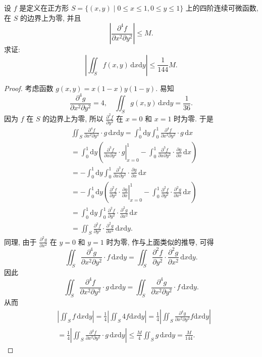 \documentclass[../../main.tex]{subfiles}%
\begin{document}
\begin{example}
设 \( f \) 是定义在正方形 \( S = \{ (x,y) \mid 0 \leqslant x \leqslant 1, 0 \leqslant y \leqslant 1 \} \) 上的四阶连续可微函数, 在 \( S \) 的边界上为零, 并且
\[
\left| \frac{\partial^4 f}{\partial x^2 \partial y^2} \right| \leqslant M.
\]
求证: 
\[
\left| \iint_S f(x,y) \, \mathrm{d}x\mathrm{d}y \right| \leqslant \frac{1}{144} M.
\]
\end{example}
\begin{proof}

考虑函数 \( g(x,y) = x(1 - x)y(1 - y) \). 易知
\[
\frac{\partial^4 g}{\partial x^2 \partial y^2} = 4, \quad \iint_S g(x,y) \, \mathrm{d}x\mathrm{d}y = \frac{1}{36}.
\]
因为 \( f \) 在 \( S \) 的边界上为零, 所以 \( \frac{\partial^2 f}{\partial y^2} \) 在 \( x = 0 \) 和 \( x = 1 \) 时为零. 于是
\begin{align*}
&\iint_S{\frac{\partial ^4f}{\partial x^2\partial y^2}}\cdot g\,\mathrm{d}x\mathrm{d}y=\int_0^1{\mathrm{d}y\int_0^1{\frac{\partial ^4f}{\partial x^2\partial y^2}}}\cdot g\,\mathrm{d}x
\\
&=\int_0^1{\mathrm{d}y\left( \left. \frac{\partial ^3f}{\partial x\partial y^2}\cdot g \right|_{x=0}^{1}-\int_0^1{\frac{\partial ^3f}{\partial x\partial y^2}}\cdot \frac{\partial g}{\partial x}\,\mathrm{d}x \right)}
\\
&=-\int_0^1{\mathrm{d}y\int_0^1{\frac{\partial ^3f}{\partial x\partial y^2}}}\cdot \frac{\partial g}{\partial x}\,\mathrm{d}x
\\
&=-\int_0^1{\mathrm{d}y\left( \left. \frac{\partial ^2f}{\partial y^2}\cdot \frac{\partial g}{\partial x} \right|_{x=0}^{1}-\int_0^1{\frac{\partial ^2f}{\partial y^2}}\cdot \frac{\partial ^2g}{\partial x^2}\,\mathrm{d}x \right)}
\\
&=\int_0^1{\mathrm{d}y\int_0^1{\frac{\partial ^2f}{\partial y^2}}}\cdot \frac{\partial ^2g}{\partial x^2}\,\mathrm{d}x
\\
&=\iint_S{\frac{\partial ^2f}{\partial y^2}}\cdot \frac{\partial ^2g}{\partial x^2}\,\mathrm{d}x\mathrm{d}y.
\end{align*}
同理, 由于 \( \frac{\partial^2 g}{\partial x^2} \) 在 \( y = 0 \) 和 \( y = 1 \) 时为零, 作与上面类似的推导, 可得
\[
\iint_S \frac{\partial^4 g}{\partial x^2 \partial y^2} \cdot f \, \mathrm{d}x\mathrm{d}y = \iint_S \frac{\partial^2 f}{\partial y^2} \cdot \frac{\partial^2 g}{\partial x^2} \, \mathrm{d}x\mathrm{d}y.
\]
因此
\[
\iint_S \frac{\partial^4 f}{\partial x^2 \partial y^2} \cdot g \, \mathrm{d}x\mathrm{d}y = \iint_S \frac{\partial^4 g}{\partial x^2 \partial y^2} \cdot f \, \mathrm{d}x\mathrm{d}y.
\]
从而
\begin{align*}
&\left| \iint_S{f\,\mathrm{d}x\mathrm{d}y} \right|=\frac{1}{4}\left| \iint_S{4f\mathrm{d}x\mathrm{d}y} \right|=\frac{1}{4}\left| \iint_S{\frac{\partial ^4g}{\partial x^2\partial y^2}f\mathrm{d}x\mathrm{d}y} \right|
\\
&=\frac{1}{4}\left| \iint_S{\frac{\partial ^4f}{\partial x^2\partial y^2}\cdot g\,\mathrm{d}x\mathrm{d}y} \right|\leqslant \frac{M}{4}\iint_S{g\,\mathrm{d}x\mathrm{d}y}=\frac{M}{144}.
\end{align*}

\end{proof}
\end{document}
